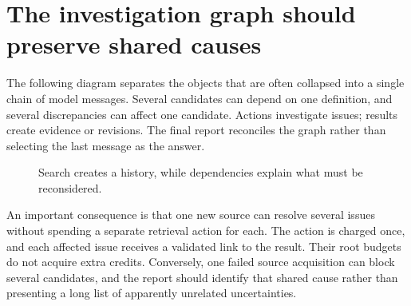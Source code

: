 \documentclass[12pt,a4paper,oneside,openany]{book}
\begin{document}
\section{The investigation graph should preserve shared causes}
\label{merge:M06:11}


The following diagram separates the objects that are often collapsed into a
single chain of model messages. Several candidates can depend on one definition,
and several discrepancies can affect one candidate. Actions investigate issues;
results create evidence or revisions. The final report reconciles the graph rather
than selecting the last message as the answer.

\begin{figure}[htbp]
\centering
{}
\caption{Search creates a history, while dependencies explain what must be reconsidered.}
\label{fig:ensemble-dependencies}
\end{figure}

An important consequence is that one new source can resolve several issues
without spending a separate retrieval action for each. The action is charged once,
and each affected issue receives a validated link to the result. Their root
budgets do not acquire extra credits. Conversely, one failed source acquisition
can block several candidates, and the report should identify that shared cause
rather than presenting a long list of apparently unrelated uncertainties.
\end{document}
